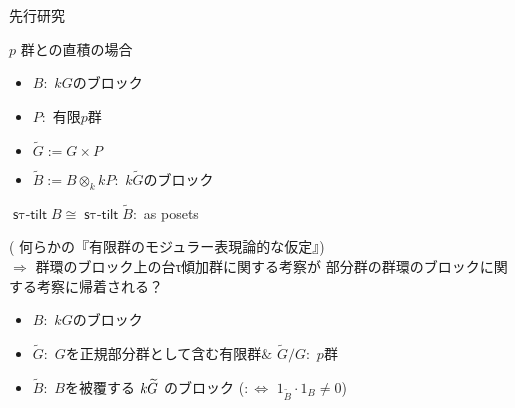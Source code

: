 \documentclass[dvipdfmx,10pt,handout
]{beamer}
\newcommand{\stautilt}{\operatorname{\mathsf{s\tau-tilt}}}
\newcommand{\inertiagp}{I}
\begin{document}
\begin{frame}{先行研究}
    \begin{block}
        {\(p\) 群との直積の場合\cite{MR3856858}}
        \begin{itemize}
            \item $B:$ $kG$のブロック
            \item $P:$ 有限$p$群
            \item \(\widetilde{G}:=G\times P\)
            \item ${\widetilde B}:=B\otimes _k kP:$ $k\widetilde{G}$のブロック
        \end{itemize}
        \hspace{10pt}$\stautilt B\cong \stautilt {\widetilde B}:$ as posets
    \end{block}
    \begin{alertblock}{}
        ( 何らかの『有限群のモジュラー表現論的な仮定』) \\
        $\Rightarrow$ 群環のブロック上の台τ傾加群に関する考察が%
        部分群の群環のブロックに関する考察に帰着される？
    \end{alertblock}
    \pause
    \begin{itemize}
        \item \(B:\) \(kG\)のブロック
        \item $\widetilde{G}:$ \(G\)を正規部分群として含む有限群\(\&\) \(\widetilde{G}/G:\) \(p\)群
        \item ${\widetilde B}:$ $B$を被覆する $k\hspace{-0.3pt}\widetilde{G}$ のブロック ($:\Leftrightarrow$  $1_{\widetilde B}{\cdot} 1_{B}\neq 0$)
    \end{itemize}
\end{frame}
\end{document}
